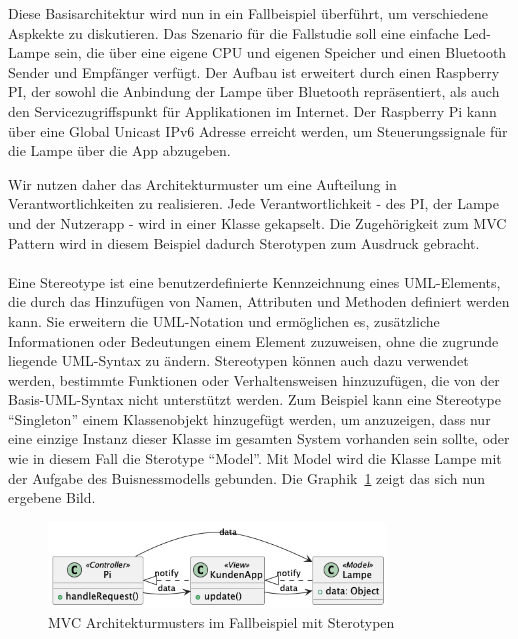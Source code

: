 Diese Basisarchitektur wird nun in ein Fallbeispiel überführt, um verschiedene Aspkekte zu diskutieren. Das Szenario für die Fallstudie soll eine einfache Led-Lampe sein, die über eine eigene CPU und eigenen Speicher und einen Bluetooth Sender und Empfänger verfügt. Der Aufbau ist erweitert durch einen Raspberry PI, der sowohl die Anbindung der Lampe über Bluetooth repräsentiert, als auch den Servicezugriffspunkt für Applikationen im Internet. Der Raspberry Pi kann über eine Global Unicast IPv6 Adresse erreicht werden, um Steuerungssignale für die Lampe über die App abzugeben. 

Wir nutzen daher das Architekturmuster um eine Aufteilung in Verantwortlichkeiten zu realisieren. Jede Verantwortlichkeit - des PI, der Lampe und der Nutzerapp - wird in einer Klasse gekapselt. Die Zugehörigkeit zum MVC Pattern wird in diesem Beispiel dadurch Sterotypen zum Ausdruck gebracht.
\\\\
Eine Stereotype ist eine benutzerdefinierte Kennzeichnung eines UML-Elements, die durch das Hinzufügen von Namen, Attributen und Methoden definiert werden kann. Sie erweitern die UML-Notation und ermöglichen es, zusätzliche Informationen oder Bedeutungen einem Element zuzuweisen, ohne die zugrunde liegende UML-Syntax zu ändern. Stereotypen können auch dazu verwendet werden, bestimmte Funktionen oder Verhaltensweisen hinzuzufügen, die von der Basis-UML-Syntax nicht unterstützt werden. Zum Beispiel kann eine Stereotype \enquote{Singleton} einem Klassenobjekt hinzugefügt werden, um anzuzeigen, dass nur eine einzige Instanz dieser Klasse im gesamten System vorhanden sein sollte, oder wie in diesem Fall die Sterotype  \enquote{Model}. Mit Model wird die Klasse Lampe mit der Aufgabe des Buisnessmodells gebunden. 
Die Graphik~\ref{fig:stereo-mvc} zeigt das sich nun ergebene Bild. 
\begin{figure}[ht]
  \centering
  \includegraphics[width=0.8\textwidth]{fig/uml/sterotypen-mvc.png}
  \caption{MVC Architekturmusters im Fallbeispiel mit Sterotypen}
  \label{fig:stereo-mvc}
\end{figure}

